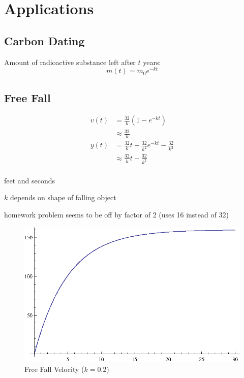 \documentclass{exam}
\begin{document}
  \section{Applications}

  \subsection{Carbon Dating}

  Amount of radioactive substance left after $t$ years:
  \[
    m(t) = m_0 e^{-kt}
  \]

  \subsection{Free Fall}

  \begin{align*}
    v(t) &= \frac{32}{k} \left( 1 - e^{-kt} \right) \\
         &\approx \frac{32}{k} \\
    y(t) &= \frac{32}{k} t + \frac{32}{k^2} e^{-kt} - \frac{32}{k^2} \\
         &\approx \frac{32}{k} t - \frac{32}{k^2} \\
  \end{align*}

  \begin{itemize*}
    \item feet and seconds
    \item $k$ depends on shape of falling object
    \item homework problem seems to be off by factor of 2 (uses 16 instead of 32)
  \end{itemize*}

  \begin{figure}[h]
    \centering
    \includegraphics[scale=0.9]{freeFallVelocity.eps}
    \caption{Free Fall Velocity ($k = 0.2$)}
  \end{figure}
\end{document}
